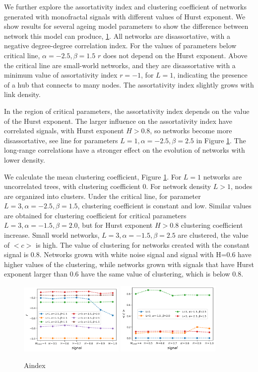 We further explore the assortativity index and clustering coefficient of networks generated with monofractal signals with different values of Hurst exponent. We show results for several ageing model parameters to show the difference between network this model can produce, \ref{fig:aindex}. All networks are disassortative, with a negative degree-degree correlation index. For the values of parameters below critical line, $\alpha=-2.5, \beta=1.5$ $r$ does not depend on the Hurst exponent. Above the critical line are small-world networks, and they are disassortative with a minimum value of assortativity index $r =-1$, for $L=1$, indicating the presence of a hub that connects to many nodes. The assortativity index slightly grows with link density. 

In the region of critical parameters, the assortativity index depends on the value of the Hurst exponent. The larger influence on the assortativity index have correlated signals, with Hurst exponent $H>0.8$, so networks become more disassortative, see line for parameters $L=1, \alpha=-2.5, \beta=2.5$ in Figure \ref{fig:aindex}. The long-range correlations have a stronger effect on the evolution of networks with lower density. 

We calculate the mean clustering coefficient, Figure \ref{fig:aindex}. For $L=1$ networks are uncorrelated trees, with clustering coefficient $0$. For network density $L>1$, nodes are organized into clusters. Under the critical line, for parameter  $L=3, \alpha=-2.5, \beta=1.5 $, clustering coefficient is constant and low. Similar values are obtained for clustering coefficient for critical parameters $L=3, \alpha=-1.5, \beta=2.0$, but for Hurst exponent $H>0.8$ clustering coefficient increase. Small world networks,  $L=3, \alpha=-1.5, \beta=2.5$ are clustered, the value of $<c>$ is high.  The value of clustering for networks created with the constant signal is 0.8. Networks grown with white noise signal and signal with H=0.6 have higher values of the clustering, while networks grown with signals that have Hurst exponent larger than 0.6 have the same value of clustering, which is below 0.8. 
 
\begin{figure}[h!]
	\centering
	\includegraphics[width=0.45\textwidth]{Figures/aindex.png}
	\includegraphics[width=0.45\textwidth]{Figures/clustering.png}
	\caption{Aindex}
	\label{fig:aindex}
\end{figure} 

